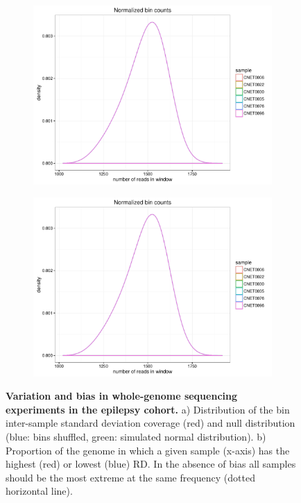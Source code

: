 \begin{figure}[htp]
  \centering
  \begin{subfigure}[b]{.48\textwidth}
    \includegraphics[width=\linewidth,page=5]{figures/epilepsy-biasWGS.pdf}
    \caption{}
    \label{fig:bias:var}
  \end{subfigure}
  \begin{subfigure}[b]{.48\textwidth}
    \includegraphics[width=\linewidth,page=6]{figures/epilepsy-biasWGS.pdf}
    \caption{}
    \label{fig:bias:rank}
  \end{subfigure}
  \caption[Variation and bias in whole-genome sequencing experiments in the epilepsy cohort.]{{\bf Variation and bias in whole-genome sequencing experiments in the epilepsy cohort.} {\small a) Distribution of the bin inter-sample standard deviation coverage (red) and null distribution (blue: bins shuffled, green: simulated normal distribution). b) Proportion of the genome in which a given sample (x-axis) has the highest (red) or lowest (blue) RD. In the absence of bias all samples should be the most extreme at the same frequency (dotted horizontal line). }}
  \label{fig:bias:varrank}
\end{figure}

